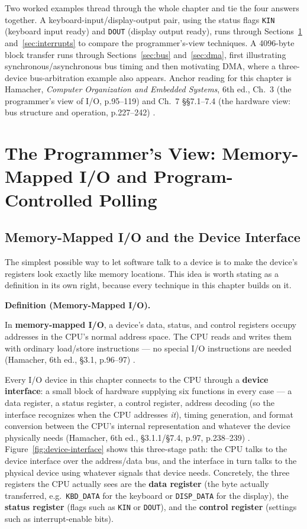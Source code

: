 \documentclass[11pt]{article}
\newenvironment{definitionbox}[1]{%
  \par\noindent\textbf{Definition (#1).}\ \itshape
}{\par\vspace{0.3em}}
\begin{document}
Two worked examples thread through the whole chapter and tie the four answers together. A keyboard-input/display-output pair, using the status flags \texttt{KIN} (keyboard input ready) and \texttt{DOUT} (display output ready), runs through Sections~\ref{sec:polling} and~\ref{sec:interrupts} to compare the programmer's-view techniques. A 4096-byte block transfer runs through Sections~\ref{sec:bus} and~\ref{sec:dma}, first illustrating synchronous/asynchronous bus timing and then motivating DMA, where a three-device bus-arbitration example also appears. Anchor reading for this chapter is Hamacher, \textit{Computer Organization and Embedded Systems}, 6th ed., Ch.~3 (the programmer's view of I/O, p.95--119) and Ch.~7 \S\S7.1--7.4 (the hardware view: bus structure and operation, p.227--242) \cite{Hamacher2002_computer_organization}.

\section{The Programmer's View: Memory-Mapped I/O and Program-Controlled Polling}
\label{sec:polling}

\subsection{Memory-Mapped I/O and the Device Interface}

The simplest possible way to let software talk to a device is to make the device's registers look exactly like memory locations. This idea is worth stating as a definition in its own right, because every technique in this chapter builds on it.

\begin{definitionbox}{Memory-Mapped I/O}
In \textbf{memory-mapped I/O}, a device's data, status, and control registers occupy addresses in the CPU's normal address space. The CPU reads and writes them with ordinary load/store instructions --- no special I/O instructions are needed (Hamacher, 6th ed., \S3.1, p.96--97) \cite{Hamacher2002_computer_organization}.
\end{definitionbox}

Every I/O device in this chapter connects to the CPU through a \textbf{device interface}: a small block of hardware supplying six functions in every case --- a data register, a status register, a control register, address decoding (so the interface recognizes when the CPU addresses \emph{it}), timing generation, and format conversion between the CPU's internal representation and whatever the device physically needs (Hamacher, 6th ed., \S3.1.1/\S7.4, p.97, p.238--239) \cite{Hamacher2002_computer_organization}. Figure~\ref{fig:device-interface} shows this three-stage path: the CPU talks to the device interface over the address/data bus, and the interface in turn talks to the physical device using whatever signals that device needs. Concretely, the three registers the CPU actually sees are the \textbf{data register} (the byte actually transferred, e.g.\ \texttt{KBD\_DATA} for the keyboard or \texttt{DISP\_DATA} for the display), the \textbf{status register} (flags such as \texttt{KIN} or \texttt{DOUT}), and the \textbf{control register} (settings such as interrupt-enable bits).
\end{document}
